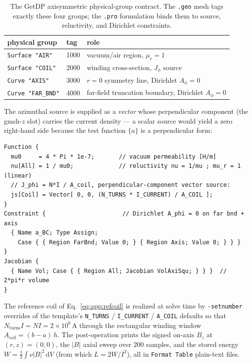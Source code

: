 \begin{table}[h]
\centering
\small
\begin{tabular}{lll}
\toprule
physical group & tag & role \\
\midrule
\texttt{Surface "AIR"}  & 1000 & vacuum/air region, $\mu_r=1$ \\
\texttt{Surface "COIL"} & 2000 & winding cross-section, $J_\phi$ source \\
\texttt{Curve "AXIS"}   & 3000 & $r=0$ symmetry line, Dirichlet $A_\phi=0$ \\
\texttt{Curve "FAR\_BND"} & 4000 & far-field truncation boundary, Dirichlet $A_\phi=0$ \\
\bottomrule
\end{tabular}
\caption{The GetDP axisymmetric physical-group contract. The
\texttt{.geo} mesh tags exactly these four groups; the \texttt{.pro}
formulation binds them to source, reluctivity, and Dirichlet constraints.}
\label{tab:app:contract}
\end{table}

The azimuthal source is supplied as a \emph{vector} whose perpendicular
component (the gmsh-$z$ slot) carries the current density --- a scalar source
would yield a zero right-hand side because the test function $\{a\}$ is a
perpendicular form:
\begin{lstlisting}
Function {
  mu0     = 4 * Pi * 1e-7;       // vacuum permeability [H/m]
  nu[All] = 1 / mu0;             // reluctivity nu = 1/mu ; mu_r = 1 (linear)
  // J_phi = N*I / A_coil, perpendicular-component vector source:
  js[Coil] = Vector[ 0, 0, (N_TURNS * I_CURRENT) / A_COIL ];
}
Constraint {                      // Dirichlet A_phi = 0 on far bnd + axis
  { Name a_BC; Type Assign;
    Case { { Region FarBnd; Value 0; } { Region Axis; Value 0; } } }
}
Jacobian {
  { Name Vol; Case { { Region All; Jacobian VolAxiSqu; } } }  // 2*pi*r volume
}
\end{lstlisting}

\noindent
The reference coil of Eq.~\eqref{eq:app:refcoil} is realized at solve time by
\verb|-setnumber| overrides of the template's \texttt{N\_TURNS} /
\texttt{I\_CURRENT} / \texttt{A\_COIL} defaults so that $N_{\text{turns}}I =
NI = 2\times10^{6}$\,A through the rectangular winding window $A_{\text{coil}} =
(b-a)\,h$. The post-operation prints the signed on-axis $B_z$ at
$(r,z)=(0,0)$, the $|B|$ axial sweep over $200$ samples, and the stored
energy $W = \tfrac12\!\int\!\nu|B|^2\,\mathrm{d}V$ (from which $L = 2W/I^2$),
all in \texttt{Format Table} plain-text files.

